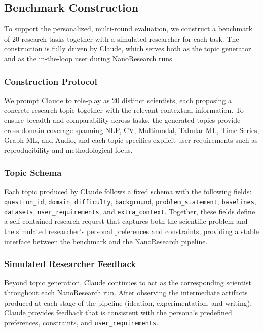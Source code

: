 \documentclass{opendatalab}
\begin{document}
\subsection{Benchmark Construction}
\label{sec:benchmark_construction}

To support the personalized, multi-round evaluation, we construct a benchmark of 20 research tasks together with a simulated researcher for each task. The construction is fully driven by Claude, which serves both as the topic generator and as the in-the-loop user during NanoResearch runs.

\subsubsection{Construction Protocol}
\label{sec:benchmark_protocol}

We prompt Claude to role-play as 20 distinct scientists, each proposing
a concrete research topic together with the relevant contextual
information. To ensure breadth and comparability across tasks, the
generated topics provide cross-domain coverage spanning NLP, CV,
Multimodal, Tabular ML, Time Series, Graph ML, and Audio, and each
topic specifies explicit user requirements such as reproducibility
and methodological focus.

\subsubsection{Topic Schema}
\label{sec:benchmark_schema}

Each topic produced by Claude follows a fixed schema with the following fields: \texttt{question\_id}, \texttt{domain}, \texttt{difficulty}, \texttt{background}, \texttt{problem\_statement}, \texttt{baselines}, \texttt{datasets}, \texttt{user\_requirements}, and \texttt{extra\_context}. Together, these fields define a self-contained research request that captures both the scientific problem and the simulated researcher's personal preferences and constraints, providing a stable interface between the benchmark and the NanoResearch pipeline.

\subsubsection{Simulated Researcher Feedback}
\label{sec:benchmark_feedback}

Beyond topic generation, Claude continues to act as the corresponding scientist throughout each NanoResearch run. After observing the intermediate artifacts produced at each stage of the pipeline (ideation, experimentation, and writing), Claude provides feedback that is consistent with the persona's predefined preferences, constraints, and \texttt{user\_requirements}. 
\end{document}

